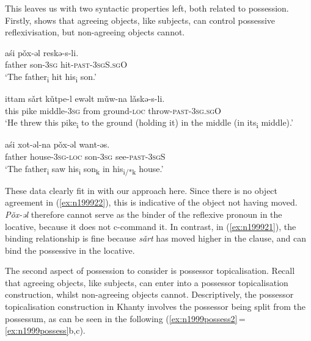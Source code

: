 \documentclass[output=paper
,modfonts
,nonflat]{langsci/langscibook}
\begin{document}
This leaves us with two syntactic properties left, both related to possession.
Firstly, \citet{nikolaeva1999} shows that agreeing objects, like subjects, can control possessive reflexivisation, but non-agreeing objects cannot. 

\begin{exe}
\ex \citet[][344]{nikolaeva1999} \label{ex:n1999possessrep}
\begin{xlist}
\ex
{\gll a\'{s}i p\v{o}x-əl reskə-s-li.\\
father son-\textsc{3sg} hit-\textsc{past-3sgS.sgO}\\
\glt `The father\textsubscript{i} hit his\textsubscript{i} son.'}

\ex
{\gll ittam s\v{a}rt k\v{u}tpe-l ewəlt m\v{u}w-na l\v{a}skə-s-li.\\
this pike middle-\textsc{3sg} from ground-\textsc{loc} throw-\textsc{past-3sg.sgO}\\
\glt `He threw this pike\textsubscript{i} to the ground (holding it) in the middle (in its\textsubscript{i} middle).'} \label{ex:n199921}

\ex
{\gll a\'{s}i xot-əl-na p\v{o}x-əl want-əs.\\
father house-\textsc{3sg-loc} son-\textsc{3sg} see-\textsc{past-3sgS}\\
\glt `The father\textsubscript{i} saw his\textsubscript{i} son\textsubscript{k} in his\textsubscript{i/*k} house.'} \label{ex:n199922}

\end{xlist}
\end{exe}

\noindent These data clearly fit in with our approach here. 
Since there is no object agreement in (\ref{ex:n199922}), this is indicative of the \theme{} object not having moved. 
\textit{P\v{o}x-əl} therefore cannot serve as the binder of the reflexive pronoun in the locative, because it does not c-command it.
In contrast, in (\ref{ex:n199921}), the binding relationship is fine because \textit{s\v{a}rt} has moved higher in the clause, and can bind the possessive in the locative.





The second aspect of possession to consider is possessor topicalisation.
Recall that agreeing objects, like subjects, can enter into a possessor topicalisation construction, whilst non-agreeing objects cannot.
Descriptively, the possessor topicalisation construction in Khanty involves the possessor being split from the possessum, as can be seen in the following (\ref{ex:n1999possess2}\,=\,\ref{ex:n1999possess}b,c).
\end{document}
